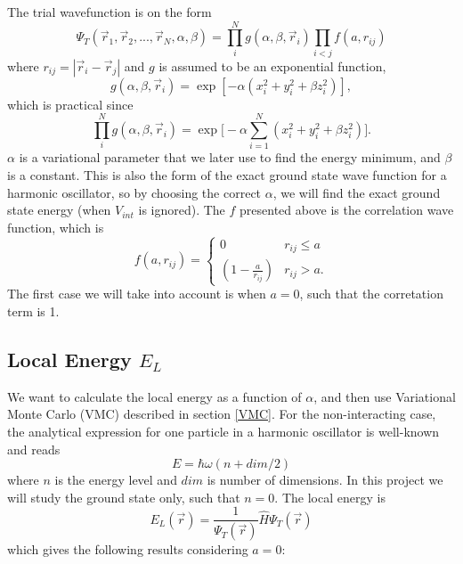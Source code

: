 \documentclass[norsk,a4paper,12pt]{article}
\begin{document}
The trial wavefunction is on the form 
\begin{equation}
\Psi_T(\vec{r}_1, \vec{r}_2, ..., \vec{r}_N, \alpha, \beta)=\prod_i^Ng(\alpha, \beta, \vec{r}_i)\prod_{i<j}f(a,r_{ij})
\label{eq:WF}
\end{equation}
where $r_{ij}=|\vec{r}_i-\vec{r}_j|$ and $g$ is assumed to be an exponential function,
\begin{equation}
g(\alpha, \beta, \vec{r}_i)=\exp[-\alpha(x_i^2+y_i^2+\beta z_i^2)],
\end{equation}
which is practical since
\begin{equation}
\prod_i^Ng(\alpha, \beta, \vec{r}_i)=\exp\Big[-\alpha\sum_{i=1}^N(x_i^2+y_i^2+\beta z_i^2)\Big].
\end{equation}
$\alpha$ is a variational parameter that we later use to find the energy minimum, and $\beta$ is a constant. This is also the form of the exact ground state wave function for a harmonic oscillator, so by choosing the correct $\alpha$, we will find the exact ground state energy (when $V_{int}$ is ignored). The $f$ presented above is the correlation wave function, which is 
\begin{equation}
f(a,r_{ij})=
\begin{cases} 
   0 & r_{ij} \leq a \\
   \left(1-\frac{a}{r_{ij}}\right) & r_{ij} > a.
\end{cases}
\end{equation}
The first case we will take into account is when $a=0$, such that the corretation term is 1. 

\subsection{Local Energy $E_L$}

We want to calculate the local energy as a function of $\alpha$, and then use Variational Monte Carlo (VMC) described in section \ref{VMC}. For the non-interacting case, the analytical expression for one particle in a harmonic oscillator is well-known and reads
\begin{equation}
E = \hbar\omega(n + dim/2)
\label{Energy_exact}
\end{equation}
where $n$ is the energy level and $dim$ is number of dimensions. In this project we will study the ground state only, such that $n=0$. The local energy is
\begin{equation}
E_L(\vec{r})=\frac{1}{\Psi_T(\vec{r})}\hat{H}\Psi_T(\vec{r})
\label{eq:Local_energy}
\end{equation}
which gives the following results considering $a=0$:
\end{document}
